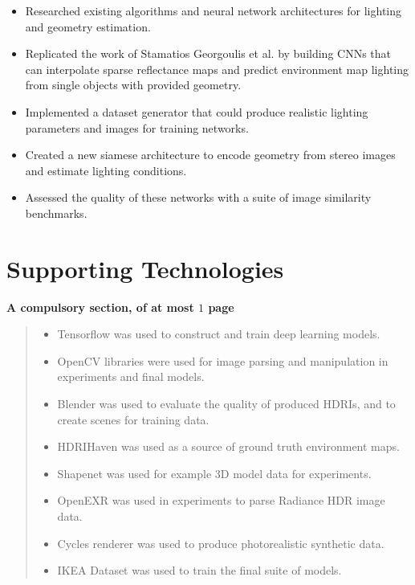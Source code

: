 \documentclass[ %
                    author={Gavin Parker},
                supervisor={Dr. Neill Campbell},
                    degree={MEng},
                     title={Deep Siamese Networks for Illumination Estimation from Stereo Images},
                  subtitle={},
                      type={research},
                      year={2018} ]{dissertation}
\begin{document}
\noindent
\begin{itemize}
\item Researched existing algorithms and neural network architectures for lighting and geometry estimation.
\item Replicated the work of Stamatios Georgoulis et al. by building CNNs that can interpolate sparse reflectance maps and predict environment map lighting from single objects with provided geometry.
\item Implemented a dataset generator that could produce realistic lighting parameters and images for training networks.
\item Created a new siamese architecture to encode geometry from stereo images and estimate lighting conditions.
\item Assessed the quality of these networks with a suite of image similarity benchmarks.
\end{itemize}
\chapter*{Supporting Technologies}

{\bf A compulsory section, of at most $1$ page}
\vspace{1cm} 
\begin{quote}
\noindent
\begin{itemize}
\item Tensorflow was used to construct and train deep learning models.
\item OpenCV libraries were used for image parsing and manipulation in experiments and final models.
\item Blender was used to evaluate the quality of produced HDRIs, and to create scenes for training data.
\item HDRIHaven was used as a source of ground truth environment maps.
\item Shapenet was used for example 3D model data for experiments.
\item OpenEXR was used in experiments to parse Radiance HDR image data.
\item Cycles renderer was used to produce photorealistic synthetic data.
\item IKEA Dataset was used to train the final suite of models.
\end{itemize}
\end{quote}

\end{document}

